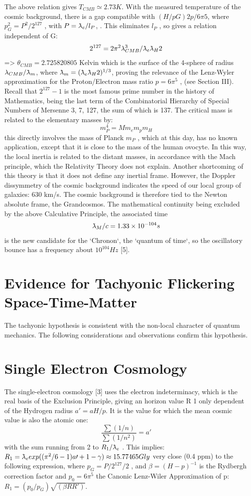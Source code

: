 The above relation gives $T_{CMB} \simeq 2.73 K$. With the measured temperature of the cosmic
background, there is a gap compatible with $(H/p G ) 2 p/6\pi 5 $, where $p_{G}^{2} = P^{2} /2^{127}$ , with $P = \lambdabar_{e} /l_{P}$, . 
This eliminates $l_{P}$ , so gives a relation independent of G:
$$2^{127} = 2\pi^{2} \lambda_{CMB}^{3} /\lambdabar_{e} \lambdabar_{H} 2$$
=> $θ_{CMB} = 2.725820805$ Kelvin which is the surface of the 4-sphere of radius $\lambda_{CMB} / \lambdabar_{m}$, where $\lambdabar_{m} = (\lambdabar_{e} \lambdabar_{H} 2 )^{1/3} $, proving the relevance of
the Lenz-Wyler approximation for the Proton/Electron mass ratio $p = 6\pi^{5}$ , (see Section III). Recall
that $2^{127} - 1$ is the most famous prime number in the history of Mathematics, being the last term of
the Combinatorial Hierarchy of Special Numbers of Mersenne 3, 7, 127, the sum of which is 137.
The critical mass is related to the elementary masses by:
$$m_{P}^{4} = M m_{e} m_{p} m_{H}$$
this directly involves the mass of Planck $m_{P}$ , which at this day, has no known application, except
that it is close to the mass of the human ovocyte. In this way, the local inertia is related to the distant
masses, in accordance with the Mach principle, which the Relativity Theory does not explain.
Another shortcoming of this theory is that it does not define any inertial frame. However, the
Doppler dissymmetry of the cosmic background indicates the speed of our local group of galaxies:
630 km/s. The cosmic background is therefore tied to the Newton absolute frame, the Grandcosmos.
The mathematical continuity being excluded by the above Calculative Principle, the associated
time $$\lambdabar_{M} /c = 1.33 \times 10^{-104}s$$ is the new candidate for the `Chronon`, the `quantum of time`, so the
oscillatory bounce has a frequency about $10^{104}Hz$ [5].

\section {Evidence for Tachyonic Flickering Space-Time-Matter}

The tachyonic hypothesis is consistent with the non-local character of quantum mechanics. The
following considerations and observations confirm this hypothesis.

\section {Single Electron Cosmology}

The single-electron cosmology [3] uses the electron indeterminacy, which is the real basis of the
Exclusion Principle, giving an horizon value R 1 only dependent of the Hydrogen radius $a\prime = aH/p$. It
is the value for which the mean cosmic value is also the atomic one:
$$\frac{\sum(1/n)}{\sum(1/n^{2})} = a\prime$$
with the sum running from 2 to $R_{1} /\lambdabar_{e}$ . This implies:
$R_{1} = \lambdabar_{e} exp((\pi^{2} /6 - 1)a\prime + 1 - \gamma) \approx 15.77465 Gly$
very close (0.4 ppm) to the following expression, where $p_{G} = P/2^{127}/2$ , and $\beta = (H - p)^{-1}$ is the
Rydbergh correction factor and $p_{0} = 6\pi^{5}$ the Canonic Lenz-Wiler Approximation of p:
$R_{1} = ( p_{0} /p_{G} ) \sqrt{(\beta R R\prime)}$.

